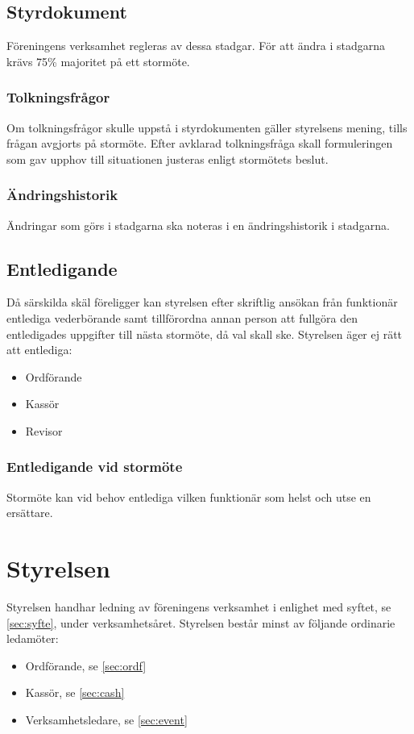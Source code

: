 \documentclass[11pt,a4paper]{article}
\begin{document}
\subsection{Styrdokument}
Föreningens verksamhet regleras av dessa stadgar. För att ändra i stadgarna krävs 75\% majoritet på ett stormöte.
\subsubsection{Tolkningsfrågor}
Om tolkningsfrågor skulle uppstå i styrdokumenten gäller styrelsens mening, tills frågan avgjorts på stormöte. Efter avklarad tolkningsfråga skall formuleringen som gav upphov till situationen justeras enligt stormötets beslut.
\subsubsection{Ändringshistorik}
Ändringar som görs i stadgarna ska noteras i en ändringshistorik i stadgarna.
\subsection{Entledigande}
Då särskilda skäl föreligger kan styrelsen efter skriftlig ansökan från funktionär entlediga vederbörande samt tillförordna annan person att fullgöra den entledigades uppgifter till nästa stormöte, då val skall ske. Styrelsen äger ej rätt att entlediga:
\begin{itemize}
	\item Ordförande
	\item Kassör
	\item Revisor
\end{itemize}
\subsubsection{Entledigande vid stormöte}
Stormöte kan vid behov entlediga vilken funktionär som helst och utse en ersättare.

\section{Styrelsen}
Styrelsen handhar ledning av föreningens verksamhet i enlighet med syftet, se \ref{sec:syfte}, under verksamhetsåret. Styrelsen består minst av följande ordinarie ledamöter:
\begin{itemize}
	\item Ordförande, se \ref{sec:ordf}
	\item Kassör, se \ref{sec:cash}
	\item Verksamhetsledare, se \ref{sec:event}
\end{itemize}
\end{document}
